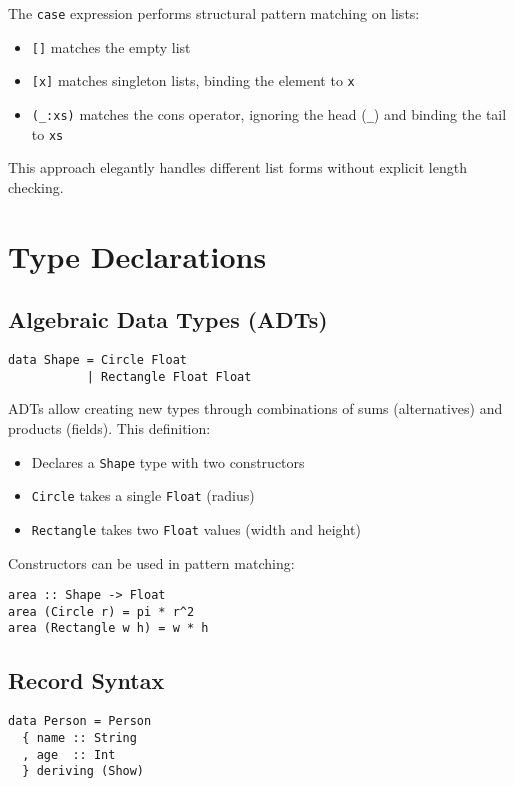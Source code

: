 \documentclass{book}
\begin{document}
The \texttt{case} expression performs structural pattern matching on lists:
\begin{itemize}
\item \texttt{[]} matches the empty list
\item \texttt{[x]} matches singleton lists, binding the element to \texttt{x}
\item \texttt{(\_:xs)} matches the cons operator, ignoring the head (\texttt{\_}) and binding the tail to \texttt{xs}
\end{itemize}

This approach elegantly handles different list forms without explicit length checking.

\section{Type Declarations}
\label{sec:types}

\subsection{Algebraic Data Types (ADTs)}
\begin{lstlisting}
data Shape = Circle Float
           | Rectangle Float Float
\end{lstlisting}

ADTs allow creating new types through combinations of sums (alternatives) and products (fields). This definition:
\begin{itemize}
\item Declares a \texttt{Shape} type with two constructors
\item \texttt{Circle} takes a single \texttt{Float} (radius)
\item \texttt{Rectangle} takes two \texttt{Float} values (width and height)
\end{itemize}

Constructors can be used in pattern matching:
\begin{lstlisting}
area :: Shape -> Float
area (Circle r) = pi * r^2
area (Rectangle w h) = w * h
\end{lstlisting}

\subsection{Record Syntax}
\begin{lstlisting}
data Person = Person
  { name :: String
  , age  :: Int
  } deriving (Show)
\end{lstlisting}
\end{document}
